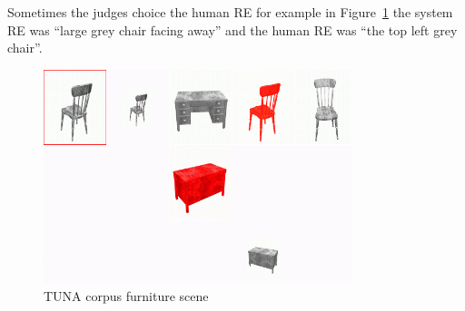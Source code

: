 Sometimes the judges choice the human RE for example in Figure~\ref{largeGreyChair} the
system RE was ``large grey chair facing away'' and the human RE was ``the top left grey chair''.

\begin{figure}[ht]
\centering
\includegraphics[width=0.8\textwidth]{images/largeGreyChair.jpg}
\caption{TUNA corpus furniture scene}
\label{largeGreyChair}
\end{figure}

